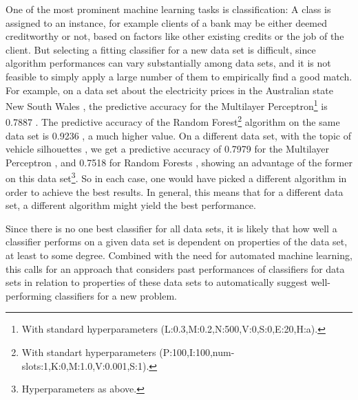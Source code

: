 One of the most prominent machine learning tasks is classification: A class is assigned to an instance, for example clients of a bank may be either deemed creditworthy or not, based on factors like other existing credits or the job of the client. But selecting a fitting classifier for a new data set is difficult, since algorithm performances can vary substantially among data sets, and it is not feasible to simply apply a large number of them to empirically find a good match. For example, on a data set about the electricity prices in the Australian state New South Wales \cite{harris1999splice}, the predictive accuracy for the Multilayer Perceptron\footnote{With standard hyperparameters (L:0.3,M:0.2,N:500,V:0,S:0,E:20,H:a).} is 0.7887 \cite{cachada2017run3}. The predictive accuracy of the Random Forest\footnote{With standart hyperparameters (P:100,I:100,num-slots:1,K:0,M:1.0,V:0.001,S:1).} algorithm on the same data set is 0.9236 \cite{cachada2017run}, a much higher value. On a different data set, with the topic of vehicle silhouettes \cite{siebert1987vehicle}, we get a predictive accuracy of 0.7979 for the Multilayer Perceptron \cite{cachada2017run4}, and 0.7518 for Random Forests \cite{cachada2017run2}, showing an advantage of the former on this data set\footnote{Hyperparameters as above.}. So in each case, one would have picked a different algorithm in order to achieve the best results. In general, this means that for a different data set, a different algorithm might yield the best performance.

Since there is no one best classifier for all data sets, it is likely that how well a classifier performs on a given data set is dependent on properties of the data set, at least to some degree. Combined with the need for automated machine learning, this calls for an approach that considers past performances of classifiers for data sets in relation to properties of these data sets to automatically suggest well-performing classifiers for a new problem.

